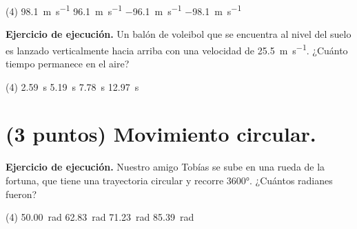 \documentclass[12pt, letter]{exam}
\begin{document}
\begin{questions}
    \begin{tasks}(4)
        \task \SI{98.1}{\meter\per\second}
        \task \SI{96.1}{\meter\per\second}
        \task \SI{-96.1}{\meter\per\second}
        \task \SI{-98.1}{\meter\per\second}
    \end{tasks}
    \question \label{Ejercicio_06} \textbf{Ejercicio de ejecución.} Un balón de voleibol que se encuentra al nivel del suelo es lanzado verticalmente hacia arriba con una velocidad de \SI{25.5}{\meter\per\second}. ¿Cuánto tiempo permanece en el aire?
    \begin{tasks}(4)
        \task \SI{2.59}{\second}
        \task \SI{5.19}{\second}
        \task \SI{7.78}{\second}
        \task \SI{12.97}{\second}
    \end{tasks}

    \section{(3 puntos) Movimiento circular.}

    \question \label{Ejercicio_07} \textbf{Ejercicio de ejecución.} Nuestro amigo Tobías se sube en una rueda de la fortuna, que tiene una trayectoria circular y recorre \ang{3600}. ¿Cuántos radianes fueron?
    \begin{tasks}(4)
        \task \SI{50.00}{\radian}
        \task \SI{62.83}{\radian}
        \task \SI{71.23}{\radian}
        \task \SI{85.39}{\radian}
    \end{tasks}
    

\end{questions}
\end{document}

